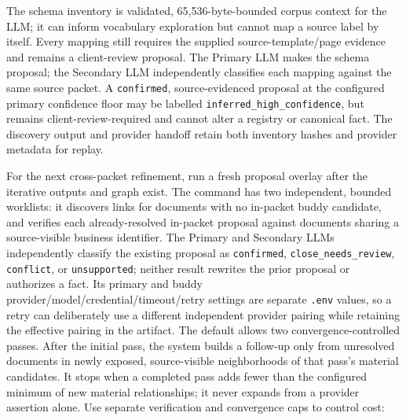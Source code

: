 \documentclass[
]{article}
\begin{document}
The schema inventory is validated, 65,536-byte-bounded corpus context
for the LLM; it can inform vocabulary exploration but cannot map a
source label by itself. Every mapping still requires the supplied
source-template/page evidence and remains a client-review proposal. The
Primary LLM makes the schema proposal; the Secondary LLM independently
classifies each mapping against the same source packet. A
\texttt{confirmed}, source-evidenced proposal at the configured primary
confidence floor may be labelled
\texttt{inferred\_\allowbreak{}high\_\allowbreak{}confidence}, but
remains client-review-required and cannot alter a registry or canonical
fact. The discovery output and provider handoff retain both inventory
hashes and provider metadata for replay.

For the next cross-packet refinement, run a fresh proposal overlay after
the iterative outputs and graph exist. The command has two independent,
bounded worklists: it discovers links for documents with no in-packet
buddy candidate, and verifies each already-resolved in-packet proposal
against documents sharing a source-visible business identifier. The
Primary and Secondary LLMs independently classify the existing proposal
as \texttt{confirmed},
\texttt{close\_\allowbreak{}needs\_\allowbreak{}review},
\texttt{conflict}, or \texttt{unsupported}; neither result rewrites the
prior proposal or authorizes a fact. Its primary and buddy
provider/model/credential/timeout/retry settings are separate
\texttt{.env} values, so a retry can deliberately use a different
independent provider pairing while retaining the effective pairing in
the artifact. The default allows two convergence-controlled passes.
After the initial pass, the system builds a follow-up only from
unresolved documents in newly exposed, source-visible neighborhoods of
that pass's material candidates. It stops when a completed pass adds
fewer than the configured minimum of new material relationships; it
never expands from a provider assertion alone. Use separate verification
and convergence caps to control cost:
\end{document}

